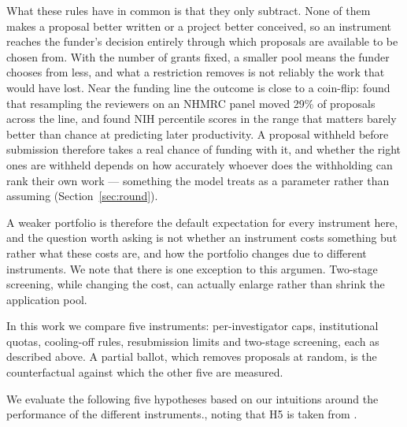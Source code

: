 \documentclass[11pt,a4paper]{article}
\begin{document}
What these rules have in common is that they only subtract. None of them makes a
proposal better written or a project better conceived, so an instrument reaches
the funder's decision entirely through which proposals are available to be chosen
from. With the number of grants fixed, a smaller pool means the funder chooses
from less, and what a restriction removes is not reliably the work that would have
lost. Near the funding line the outcome is close to a coin-flip:
\citet{graves2011} found that resampling the reviewers on an NHMRC panel moved
29\% of proposals across the line, and \citet{fang2016} found NIH percentile
scores in the range that matters barely better than chance at predicting later
productivity. A proposal withheld before submission therefore takes a real chance
of funding with it, and whether the right ones are withheld depends on how
accurately whoever does the withholding can rank their own work --- something the
model treats as a parameter rather than assuming (Section~\ref{sec:round}).

A weaker portfolio is therefore the default expectation for every instrument
here, and the question worth asking is not whether an instrument costs something
but rather what these costs are, and how the portfolio changes due to different instruments. We note that there is one exception
to this argumen. Two-stage screening, while changing the cost, can actually enlarge rather than shrink the application pool.

In this work we compare five instruments: per-investigator caps, institutional quotas,
cooling-off rules, resubmission limits and two-stage screening, each as described
above. A partial ballot, which removes proposals at random, is the counterfactual
against which the other five are measured.

We evaluate the following five hypotheses based on our intuitions around the performance of the different instruments., noting that H5 is taken from
\citet{roebber2011}.
\end{document}
